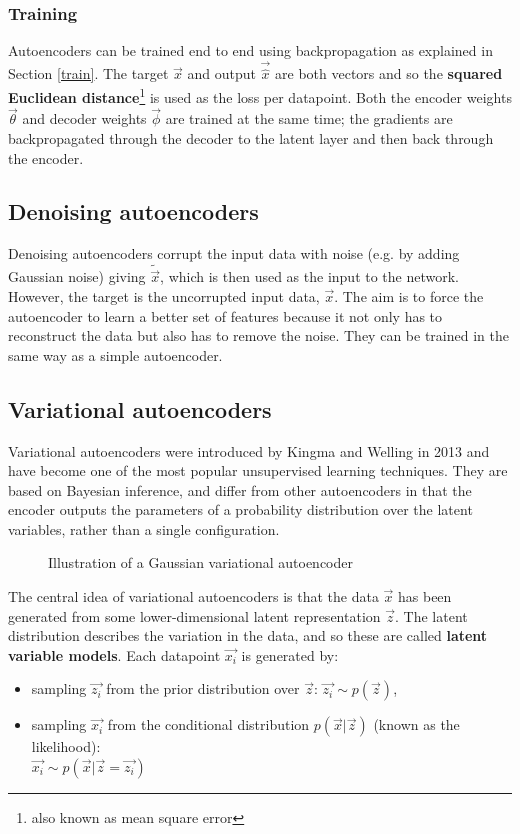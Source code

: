 \subsubsection{Training}
Autoencoders can be trained end to end using backpropagation as explained in Section \ref{train}. The target $\vec{x}$ and output 
$\vec{\hat{x}}$ are both vectors and so 
the \textbf{squared Euclidean distance}\footnote{also known as mean square error} is used as the loss per datapoint. Both the encoder weights 
$\vec{\theta}$ and 
decoder weights $\vec{\phi}$ 
are trained at the 
same time; the gradients are backpropagated through the decoder to the latent layer and then back through the encoder. 

\subsection{Denoising autoencoders}

Denoising autoencoders corrupt the input data with noise (e.g. by adding Gaussian noise) giving $\tilde{\vec{x}}$, which is then used as the 
input to the network. However, the target is the uncorrupted input data, 
$\vec{x}$. The aim is to force the autoencoder to learn a better set of features because it not only has to reconstruct the data but also 
has to remove the noise. They can be trained in the same way as a simple autoencoder.

\subsection{Variational autoencoders} \label{vae}

Variational autoencoders were 
introduced by Kingma and Welling in 2013 and have become one of the most popular unsupervised learning techniques. 
They are based on Bayesian inference, and differ from other autoencoders in that the encoder outputs
the parameters of a probability distribution over the latent variables, rather than a single configuration.
\begin{figure}[H]
  \begin{center}
      \scalebox{.7}{}
      \caption{Illustration of a Gaussian variational autoencoder}
      \label{fig:gauss_vae}
  \end{center}
\end{figure}

The central idea of variational autoencoders is that the data $\vec{x}$ has been generated from some lower-dimensional latent
representation $\vec{z}$. The latent distribution describes the variation in the data, and so these are called 
\textbf{latent variable models}. Each datapoint $\vec{x_{i}}$ is generated by:
\begin{itemize}
  \item sampling $\vec{z_{i}}$ from the prior distribution over $\vec{z}$: $\vec{z_{i}} \sim p(\vec{z})$, 
  \item sampling $\vec{x_{i}}$ from the conditional distribution $p(\vec{x}|\vec{z})$ (known as the likelihood): \\ 
  $\vec{x_{i}} \sim p(\vec{x}|\vec{z}=\vec{z_{i}})$
\end{itemize}


